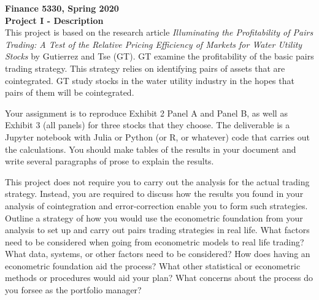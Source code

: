 \documentclass[11pt]{article}
\begin{document}
\pagestyle{empty}

\textbf{Finance 5330, Spring 2020} \\
\textbf{Project I -  Description}     \\

\bigskip
This project is based on the research article \textit{Illuminating the Profitability of Pairs Trading:
A Test of the Relative Pricing Efficiency of Markets for Water Utility Stocks} by Gutierrez and Tse (GT).
GT examine the profitability of the basic pairs trading strategy. This strategy relies on identifying
pairs of assets that are cointegrated. GT study stocks in the water utility industry in the hopes that 
pairs of them will be cointegrated. 

\bigskip
Your assignment is to reproduce Exhibit 2 Panel A and Panel B, as well as Exhibit 3 (all panels) for
three stocks that they choose. The deliverable is a Jupyter notebook with Julia or Python (or R, or 
whatever) code that carries out the calculations. You should make tables of the results in your document
and write several paragraphs of prose to explain the results. 

\bigskip
This project does not require you to carry out the analysis for the actual trading strategy. Instead,
you are required to discuss how the results you found in your analysis of cointegration and 
error-correction enable you to form such strategies. Outline a strategy of how you would use the
econometric foundation from your analysis to set up and carry out pairs trading strategies in real
life. What factors need to be considered when going from econometric models to real life trading?
What data, systems, or other factors need to be considered? How does having an econometric foundation
aid the process? What other statistical or econometric methods or procedures would aid your plan?
What concerns about the process do you forsee as the portfolio manager?
\end{document}
